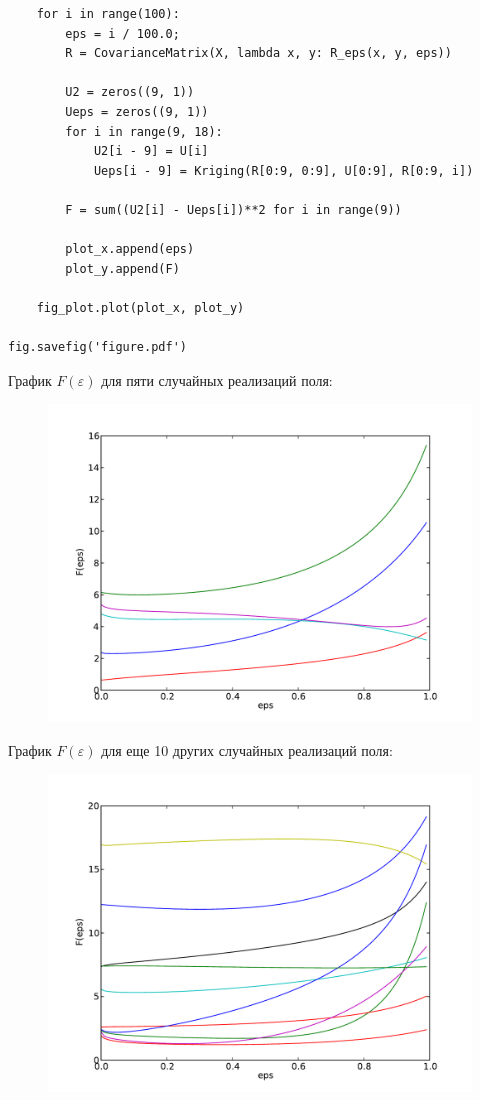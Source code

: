 \documentclass[a4paper, 12pt, onepage]{article}
\begin{document}
{\begin{verbatim}
    for i in range(100):
        eps = i / 100.0;
        R = CovarianceMatrix(X, lambda x, y: R_eps(x, y, eps))

        U2 = zeros((9, 1))
        Ueps = zeros((9, 1))
        for i in range(9, 18):
            U2[i - 9] = U[i]
            Ueps[i - 9] = Kriging(R[0:9, 0:9], U[0:9], R[0:9, i])

        F = sum((U2[i] - Ueps[i])**2 for i in range(9))

        plot_x.append(eps)
        plot_y.append(F)

    fig_plot.plot(plot_x, plot_y)

fig.savefig('figure.pdf')
\end{verbatim}
}

\newpage
График $F(\varepsilon)$ для пяти случайных реализаций поля:
\begin{figure}[htp]
  \includegraphics[scale=0.5]{figure.pdf}
\end{figure}

График $F(\varepsilon)$ для еще 10 других случайных реализаций поля:
\begin{figure}[htp]
  \includegraphics[scale=0.5]{figure2.pdf}
\end{figure}
\end{document}
